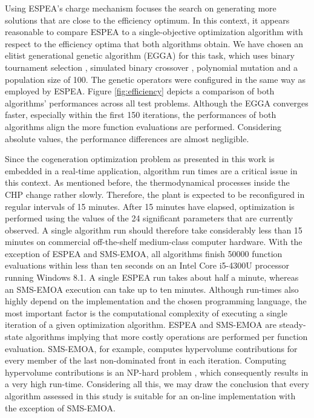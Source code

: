 Using ESPEA's charge mechanism focuses the search on generating more solutions that are close to the efficiency optimum. In this context, it appears reasonable to compare ESPEA to a single-objective optimization algorithm with respect to the efficiency optima that both algorithms obtain. We have chosen an elitist generational genetic algorithm (EGGA) for this task, which uses binary tournament selection \cite{goldberg1991comparative}, simulated binary crossover \cite{sbx}, polynomial mutation \cite{polynomialmutation} and a population size of 100. The genetic operators were configured in the same way as employed by ESPEA. Figure \ref{fig:efficiency} depicts a comparison of both algorithms' performances across all test problems. Although the EGGA converges faster, especially within the first 150 iterations, the performances of both algorithms align the more function evaluations are performed. Considering absolute values, the performance differences are almost negligible.

Since the cogeneration optimization problem as presented in this work is embedded in a real-time application, algorithm run times are a critical issue in this context.
%
As mentioned before, the thermodynamical processes inside the CHP change rather slowly. Therefore, the plant is expected to be reconfigured in regular intervals of 15 minutes.
After 15 minutes have elapsed, optimization is performed using the values of the 24 significant parameters that are currently observed.
%
%
A single algorithm run should therefore take considerably less than 15 minutes on commercial off-the-shelf medium-class computer hardware. With the exception of ESPEA and SMS-EMOA, all algorithms finish \num{50000} function evaluations within less than ten seconds on an Intel Core i5-4300U processor running Windows 8.1. A single ESPEA run takes about half a minute, whereas an SMS-EMOA execution can take up to ten minutes. Although run-times also highly depend on the implementation and the chosen programming language, the most important factor is the computational complexity of executing a single iteration of a given optimization algorithm. ESPEA and SMS-EMOA are steady-state algorithms implying that more costly operations are performed per function evaluation. SMS-EMOA, for example, computes hypervolume contributions for every member of the last non-dominated front in each iteration. Computing hypervolume contributions is an NP-hard problem \cite{hypervolumecontribution}, which consequently results in a very high run-time. Considering all this, we may draw the conclusion that every algorithm assessed in this study is suitable for an on-line implementation with the exception of SMS-EMOA.

